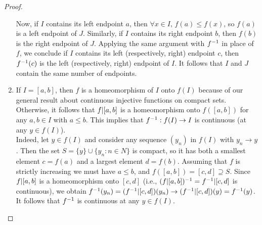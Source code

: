 \begin{proof}
\begin{enumerate}
        Now, if $I$ contains its left endpoint $a$, then $\forall x \in I$, $f(a) \leq f(x)$, so $f(a)$ is a left endpoint of $J$. Similarly, if $I$ contains its right endpoint $b$, then $f(b)$ is the right endpoint of $J$. Applying the same argument with $f ^{-1}$ in place of $f$, we conclude if $I$ contains its left (respectively, right) endpoint $c$, then $f ^{-1} (c)$ is the left (respectively, right) endpoint of $I$. It follows that $I$ and $J$ contain the same number of endpoints.
        \item If $I = [a,b]$, then $f$ is a homeomorphism of $I$ onto $f(I)$ because of our general result about continuous injective functions on compact sets. \\
        Otherwise, it follows that $f \vert [a,b]$ is a homeomorphism onto $f([a,b])$ for any $a,b \in I$ with $a \leq b$. This implies that $f ^{-1}: f(I) \to I$ is continuous (at any $y \in f(I)$). \\
        Indeed, let $y \in f(I)$ and consider any sequence $(y_n)$ in $f(I)$ with $y_n \to y$. Then the set $S = \{y\} \cup \{y_n: n \in N\}$ is compact, so it has both a smallest element $c = f(a)$ and a largest element $d = f(b)$. Assuming that $f$ is strictly increasing we must have $a \leq b$, and $f([a,b]) = [c,d] \supseteq S$. Since $f \vert [a,b]$ is a homeomorphism onto $[c,d]$ (i.e., $(f \vert [a,b])^{-1} = f^{-1} \vert [c,d]$ is continuous), we obtain $f ^{-1} (y_n) = (f ^{-1} \vert [c,d])(y_n) \to (f ^{-1} \vert [c,d])(y) = f ^{-1} (y)$. It follows that $f ^{-1}$ is continuous at any $y \in f(I)$.
    \end{enumerate}
\end{proof}